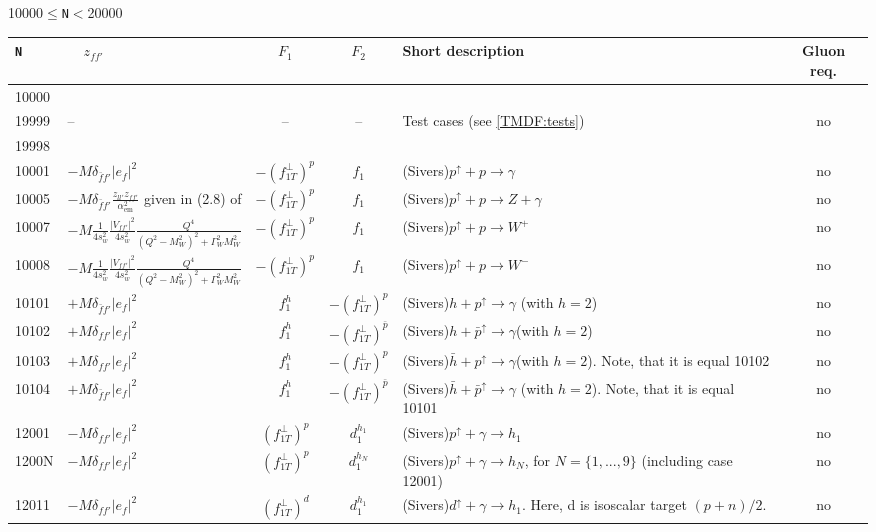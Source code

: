 \documentclass[prd,nofootinbib,eqsecnum,final]{revtex4}
\newcommand{\Ds}{\displaystyle}
\renewcommand{\(}{\left(}
\renewcommand{\)}{\right)}
\renewcommand{\[}{\left[}
\renewcommand{\]}{\right]}
\begin{document}
\begin{center}
10000$\leqslant$\texttt{N}$<$20000
\\
\begin{longtable}{||l|p{6cm}|c|c||p{7cm}|c||}
\hline\hline
\texttt{N} & ~~$z_{ff'}$~~& ~~$F_1$~~ & ~~$F_2$~~&  Short description & Gluon req. 
\\\hline
10000 &  &  &  &  & 
\\
19999 & -- & -- & -- & Test cases (see \ref{TMDF:tests}) & no
\\
19998 &  &  &  &  & 
\\\hline\hline
10001 & $-M\delta_{\bar f f'}|e_f|^2$ & $-(f_{1T}^\perp)^p$ & $f_1$ & (Sivers)$p^{\uparrow}+p\to\gamma$ & no
\\\hline
10005 & $-M\Ds\delta_{\bar f f'}\frac{z_{ll'}z_{ff'}}{\alpha_{\text{em}}^2}$ given in (2.8) of \cite{Scimemi:2017etj} & $-(f_{1T}^\perp)^p$ & $f_1$ & (Sivers)$p^{\uparrow}+p\to Z+\gamma$ & no
\\\hline
10007 & $-M\Ds \frac{1}{4s_w^2}\frac{|V_{f f'}|^2}{4s_w^2}\frac{Q^4}{(Q^2-M_W^2)^2+\Gamma_W^2M_W^2}$ & $-(f_{1T}^\perp)^p$ & $f_1$ & (Sivers)$p^{\uparrow}+p\to W^+$ & no
\\\hline
10008 & $-M\Ds \frac{1}{4s_w^2}\frac{|V_{f f'}|^2}{4s_w^2}\frac{Q^4}{(Q^2-M_W^2)^2+\Gamma_W^2M_W^2}$ & $-(f_{1T}^\perp)^p$ & $f_1$ & (Sivers)$p^{\uparrow}+p\to W^-$ & no
\\\hline
10101 & $+M\delta_{\bar f f'}|e_f|^2$ & $f^h_1$ & $-(f_{1T}^\perp)^{p}$ & (Sivers)$h+p^\uparrow\to\gamma$ (with $h=2$) & no
\\\hline
10102 & $+M\delta_{f f'}|e_f|^2$ & $f^h_1$ & $-(f_{1T}^\perp)^{\bar p}$  & (Sivers)$h+\bar p^\uparrow\to\gamma$(with $h=2$) & no
\\\hline
10103 & $+M\delta_{f f'}|e_f|^2$ & $f^h_1$ & $-(f_{1T}^\perp)^{p}$  & (Sivers)$\bar h+p^\uparrow\to\gamma$(with $h=2$). Note, that it is equal 10102 & no
\\\hline
10104 & $+M\delta_{\bar f f'}|e_f|^2$ & $f^h_1$ & $-(f_{1T}^\perp)^{\bar p}$  & (Sivers)$\bar h+\bar p^\uparrow\to\gamma$ (with $h=2$). Note, that it is equal 10101 & no
\\\hline \hline
12001 & $-M\delta_{ff'}|e_f|^2$~~&$(f_{1T}^\perp)^p$ & $d^{h_1}_1$ & (Sivers)$p^{\uparrow}+\gamma\to h_1$ & no
\\\hline
1200N & $-M\delta_{ff'}|e_f|^2$~~&$(f_{1T}^\perp)^p$ & $d^{h_N}_1$ & (Sivers)$p^{\uparrow}+\gamma\to h_N$, for $N=\{1,...,9\}$ (including case 12001) & no
\\\hline \hline
12011 & $-M\delta_{ff'}|e_f|^2$~~&$(f_{1T}^\perp)^{d}$ & $d^{h_1}_1$ & (Sivers)$d^{\uparrow}+\gamma\to h_1$. Here, d is isoscalar target $(p+n)/2$. & no

\end{longtable}
\end{center}
\end{document}
